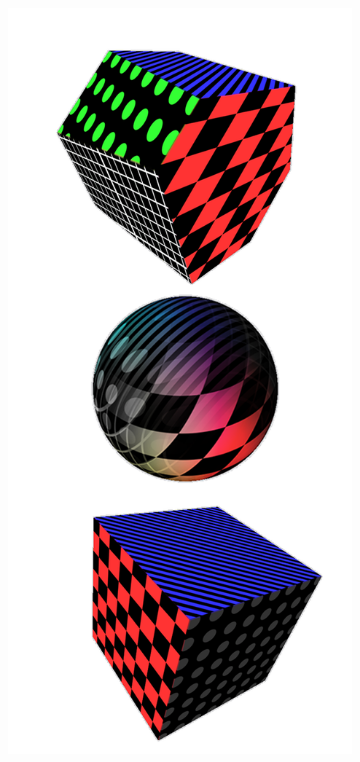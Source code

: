 \documentclass{l4proj}
\begin{document}
\begin{figure}[H]
  \begin{subfigure}[b]{0.25\textwidth}
    \includegraphics[width=\textwidth]{images/textures/pattern-rgbw.png}

\end{subfigure}
\end{figure}
\end{document}
